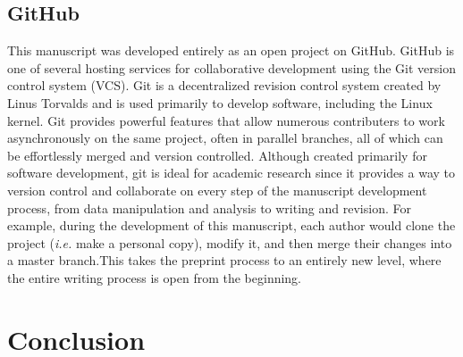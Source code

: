 \documentclass[letterpaper,twocolumn,superscriptaddress,showkeys,longbibliography]{revtex4-1}
\begin{document}
\subsection{GitHub}

This manuscript was developed entirely as an open project on GitHub. GitHub is
one of several hosting services for collaborative development using the Git
version control system (VCS).  Git is a decentralized revision control system
created by Linus Torvalds and is used primarily to develop software, including
the Linux kernel. Git provides powerful features that allow numerous contributers to work asynchronously on the same project, often in parallel branches, all of which can be effortlessly merged and version controlled. Although created primarily for software development, git is ideal for academic research since it provides a way to version control and collaborate on every step of the manuscript development process, from data manipulation and analysis to writing and revision. For example, during the development of this manuscript, each author
would clone the project (\emph{i.e.} make a personal copy), modify it, and then merge their changes into a master branch.This takes the preprint process to an entirely new level, where the entire writing process is open from the beginning.

\section{Conclusion}
\end{document}
